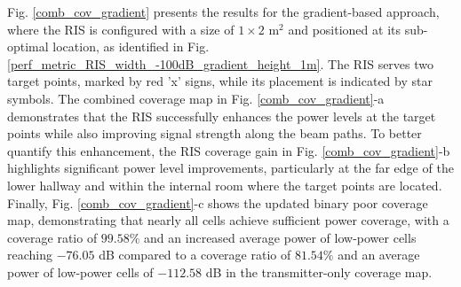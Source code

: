 \documentclass{IEEEoj}
\begin{document}
Fig. \ref{comb_cov_gradient} presents the results for the gradient-based approach, where the RIS is configured with a size of $1 \times 2$ m$^2$ and positioned at its sub-optimal location, as identified in Fig. \ref{perf_metric_RIS_width_-100dB_gradient_height_1m}. The RIS serves two target points, marked by red 'x' signs, while its placement is indicated by star symbols. The combined coverage map in Fig. \ref{comb_cov_gradient}-a demonstrates that the RIS successfully enhances the power levels at the target points while also improving signal strength along the beam paths. To better quantify this enhancement, the RIS coverage gain in Fig. \ref{comb_cov_gradient}-b highlights significant power level improvements, particularly at the far edge of the lower hallway and within the internal room where the target points are located. Finally, Fig. \ref{comb_cov_gradient}-c shows the updated binary poor coverage map, demonstrating that nearly all cells achieve sufficient power coverage, with a coverage ratio of $99.58\%$ and an increased average power of low-power cells reaching $-76.05$ dB compared to a coverage ratio of $81.54\%$ and an average power of low-power cells of $-112.58$ dB in the transmitter-only coverage map.
\end{document}
